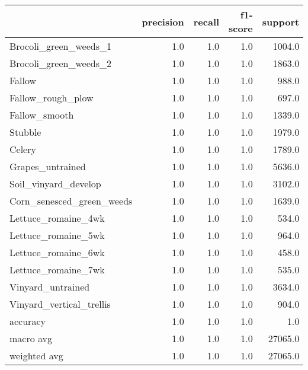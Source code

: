 \begin{tabular}{lrrrr}
\toprule
{} &  precision &  recall &  f1-score &  support \\
\midrule
Brocoli\_green\_weeds\_1     &        1.0 &     1.0 &       1.0 &   1004.0 \\
Brocoli\_green\_weeds\_2     &        1.0 &     1.0 &       1.0 &   1863.0 \\
Fallow                    &        1.0 &     1.0 &       1.0 &    988.0 \\
Fallow\_rough\_plow         &        1.0 &     1.0 &       1.0 &    697.0 \\
Fallow\_smooth             &        1.0 &     1.0 &       1.0 &   1339.0 \\
Stubble                   &        1.0 &     1.0 &       1.0 &   1979.0 \\
Celery                    &        1.0 &     1.0 &       1.0 &   1789.0 \\
Grapes\_untrained          &        1.0 &     1.0 &       1.0 &   5636.0 \\
Soil\_vinyard\_develop      &        1.0 &     1.0 &       1.0 &   3102.0 \\
Corn\_senesced\_green\_weeds &        1.0 &     1.0 &       1.0 &   1639.0 \\
Lettuce\_romaine\_4wk       &        1.0 &     1.0 &       1.0 &    534.0 \\
Lettuce\_romaine\_5wk       &        1.0 &     1.0 &       1.0 &    964.0 \\
Lettuce\_romaine\_6wk       &        1.0 &     1.0 &       1.0 &    458.0 \\
Lettuce\_romaine\_7wk       &        1.0 &     1.0 &       1.0 &    535.0 \\
Vinyard\_untrained         &        1.0 &     1.0 &       1.0 &   3634.0 \\
Vinyard\_vertical\_trellis  &        1.0 &     1.0 &       1.0 &    904.0 \\
accuracy                  &        1.0 &     1.0 &       1.0 &      1.0 \\
macro avg                 &        1.0 &     1.0 &       1.0 &  27065.0 \\
weighted avg              &        1.0 &     1.0 &       1.0 &  27065.0 \\
\bottomrule
\end{tabular}
